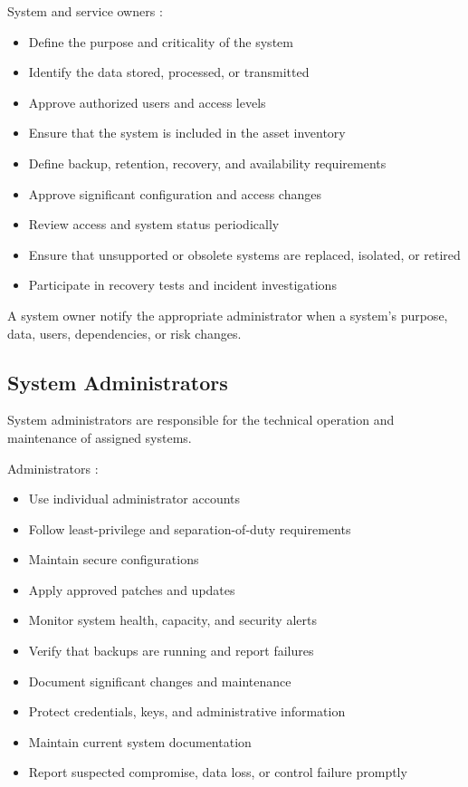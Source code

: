 System and service owners \must{}:
\begin{itemize}
    \item Define the purpose and criticality of the system
    \item Identify the data stored, processed, or transmitted
    \item Approve authorized users and access levels
    \item Ensure that the system is included in the asset inventory
    \item Define backup, retention, recovery, and availability requirements
    \item Approve significant configuration and access changes
    \item Review access and system status periodically
    \item Ensure that unsupported or obsolete systems are replaced, isolated, or retired
    \item Participate in recovery tests and incident investigations
\end{itemize}

A system owner \must{} notify the appropriate administrator when a system's purpose, data, users, dependencies, or risk changes.

\subsection{System Administrators}

System administrators are responsible for the technical operation and maintenance of assigned systems.

Administrators \must{}:
\begin{itemize}
    \item Use individual administrator accounts
    \item Follow least-privilege and separation-of-duty requirements
    \item Maintain secure configurations
    \item Apply approved patches and updates
    \item Monitor system health, capacity, and security alerts
    \item Verify that backups are running and report failures
    \item Document significant changes and maintenance
    \item Protect credentials, keys, and administrative information
    \item Maintain current system documentation
    \item Report suspected compromise, data loss, or control failure promptly
\end{itemize}

